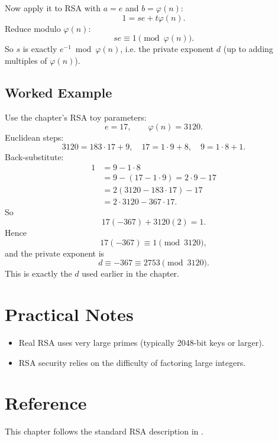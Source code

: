 Now apply it to RSA with \(a=e\) and \(b=\varphi(n)\):
\[
1 = se + t\varphi(n).
\]
Reduce modulo \(\varphi(n)\):
\[
se \equiv 1 \pmod{\varphi(n)}.
\]
So \(s\) is exactly \(e^{-1}\bmod \varphi(n)\), i.e. the private exponent
\(d\) (up to adding multiples of \(\varphi(n)\)).

\subsection*{Worked Example}
Use the chapter's RSA toy parameters:
\[
  e=17,\qquad \varphi(n)=3120.
\]
Euclidean steps:
\[
3120=183\cdot17+9,\quad
17=1\cdot9+8,\quad
9=1\cdot8+1.
\]
Back-substitute:
\[
\begin{aligned}
1&=9-1\cdot8\\
 &=9-(17-1\cdot9)=2\cdot9-17\\
 &=2(3120-183\cdot17)-17\\
 &=2\cdot3120-367\cdot17.
\end{aligned}
\]
So
\[
17(-367)+3120(2)=1.
\]
Hence
\[
17(-367)\equiv1\pmod{3120},
\]
and the private exponent is
\[
d\equiv -367\equiv 2753\pmod{3120}.
\]
This is exactly the \(d\) used earlier in the chapter.

\section{Practical Notes}
\begin{itemize}
  \item Real RSA uses very large primes (typically 2048-bit keys or larger).
  \item RSA security relies on the difficulty of factoring large integers.
\end{itemize}

\section*{Reference}
This chapter follows the standard RSA description in \cite{wiki:rsa-cryptosystem}.
